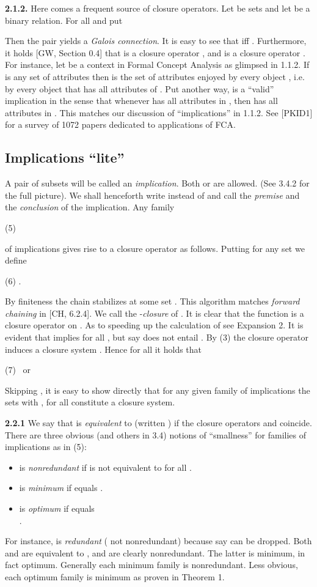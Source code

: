 \documentclass[11pt]{article}
\begin{document}
{\bf 2.1.2.} Here comes a frequent source of closure operators. Let  be sets and let  be a binary relation. 
For all  and  put 

Then the pair  yields a {\it Galois connection}. It is easy to see that  iff . Furthermore, it holds [GW, Section 0.4] that  is a closure operator , and  is a closure operator .  
For instance, let  be a context in Formal Concept Analysis as glimpsed in 1.1.2. If  is any set of attributes then  is the set of attributes  enjoyed by every object , i.e. by every object  that has all attributes of .  Put another way,  is a ``valid'' implication in the sense that whenever  has all attributes in , then  has all attributes in . This matches our discussion of ``implications''  in 1.1.2. See [PKID1] for a survey of 1072 papers dedicated to applications of FCA.



\subsection{Implications ``lite''}

A pair of subsets  will be called an {\it implication}. Both  or  are allowed. (See 3.4.2 for the full picture). We shall henceforth write  instead of  and call  the {\it premise} and  the {\it conclusion} of the implication.  Any family

(5) \quad 

of implications gives rise to a closure operator as follows. Putting  for any set  we define

(6) \quad .

By finiteness the chain  stabilizes at some set . This algorithm matches {\it forward chaining} in [CH, 6.2.4]. We call  the -{\it closure} of . It is clear that the function  is a closure operator on . As to speeding up the calculation of  see Expansion 2.
 It is evident that  implies  for all , but say  does not entail .
 By (3) the closure operator  induces a closure system . Hence for all  it holds that
 
 (7) \quad  \ or \ 

Skipping , it is easy to show directly that for any given family  of implications the sets  with , for all  constitute a closure system.

{\bf 2.2.1}  We say that  is {\it equivalent} to  (written ) if the closure operators  and  coincide. There are three obvious (and others in 3.4) notions of ``smallness'' for families  of implications as in (5):
\begin{itemize}
	\item  is {\it nonredundant} if  is not equivalent to  for all .
	\item  is {\it minimum} if  equals .
	\item  is {\it optimum} if   equals\\
	 .
\end{itemize}
For instance,  is {\it redundant} ( not nonredundant) because say  can be dropped. 
Both  and  are equivalent to , and are clearly nonredundant. The latter is minimum, in fact optimum. Generally each minimum family is nonredundant. Less obvious, each optimum family is minimum as proven in Theorem 1. 
\end{document}
